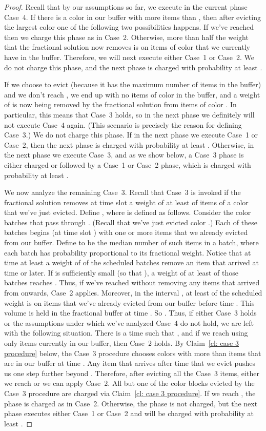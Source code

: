 \documentclass[12pt]{article}
\begin{document}
\begin{proof}
Recall that by our assumptions so far, we execute in the
current phase Case~4.
If there is a color in our buffer with more items than , 
then after evicting the largest color one of the following
two possibilities happens. If we've reached  then we
charge this phase as in Case~2. Otherwise, more than half 
the weight that the fractional solution now removes is on
items of color  that we currently have in the buffer. 
Therefore, we will next execute either Case~1 or Case~2.
We do not charge this phase,
and the next phase is charged with probability at least 
.

If we choose to evict  (because it has the maximum
number of items in the buffer) and we don't reach , 
we end up with no items of color  in the buffer, and a
weight of  is now
being removed by the fractional solution from items of
color . In particular, this means that Case~3 holds, so
in the next phase we definitely will not execute Case~4 again.
(This scenario is precisely the reason for defining Case~3.)
We do not charge this phase. If in the next phase we execute 
Case~1 or Case~2, then the next phase is charged with 
probability at least . Otherwise, in the next
phase we execute Case~3, and as we show below, a Case~3 
phase is either charged or followed by a Case~1 or Case~2 
phase, which is charged with probability at least .

We now analyze the remaining Case~3. Recall that Case~3 is
invoked if the fractional solution removes at time slot 
a weight of at least  of items of a color that we've
just evicted. Define , where  is 
defined as follows. Consider the color  batches that pass
through . (Recall that we've just evicted color .)
Each of these batches begins (at time slot ) with one
or more items that we already evicted from our buffer. Define
 to be the median number of such items in a batch, where
each batch has probability proportional to its fractional weight.
Notice that at time  at least a weight of  
of the scheduled batches remove an item that arrived 
at time  or later. If 
is sufficiently small (so that ), 
a weight of at least  of those batches
reaches . Thus, if we've reached  without
removing any items that arrived from  onwards,
Case~2 applies.
Moreover, in the interval ,
at least  of the scheduled weight is on
items that we've already evicted from our buffer
before time . This volume is held in the fractional 
buffer at time . So .
Thus, if either Case~3 holds or the assumptions under 
which we've analyzed Case~4 do not hold, we are left 
with the following situation. There is a time  such
that , and if we reach
 using only items currently in our buffer, then
Case~2 holds. 
By Claim~\ref{cl: case 3 procedure} below, the Case~3 
procedure chooses colors with 
more than  items that are in our buffer at time 
. Any item that arrives after time  that we evict
pushes us one step further beyond . Therefore,
after evicting all the Case~3 items, either we reach 
or we can apply Case~2. All but one of the color blocks 
evicted by the Case~3 procedure are charged via 
Claim~\ref{cl: case 3 procedure}.
If we reach , the phase is charged as in Case~2.
Otherwise, the phase is not charged, but the next phase
executes either Case~1 or Case~2 and will be charged
with probability at least . 


\end{proof}
\end{document}
